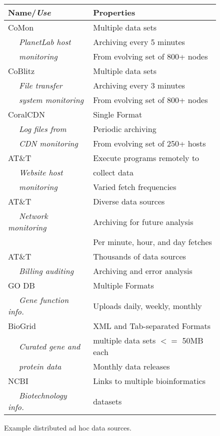 \begin{figure}
\begin{center}
\begin{tabular}{|l|l|}
\hline
{\bf Name/{\em Use}} & {\bf Properties} 
\\\hline\hline
CoMon~\cite{comon} & Multiple data sets \\
{\em ~~ PlanetLab host}              & Archiving every 5 minutes \\
{\em ~~ monitoring}                              & From evolving set of 800+ nodes \\\hline
CoBlitz~\cite{coblitz}   & Multiple data sets \\
{\em ~~ File transfer}        & Archiving every 3 minutes \\
{\em ~~ system monitoring}                                      & From evolving set of 800+ nodes \\\hline
CoralCDN~\cite{coral}         & Single Format \\
{\em ~~ Log files from}  & Periodic archiving \\
{\em ~~ CDN monitoring}                  & From evolving set of 250+ hosts \\\hline
AT\&T \vizGems{}                    & Execute programs remotely to \\
{\em ~~ Website host}                 & collect data \\
{\em ~~  monitoring}                   & Varied fetch frequencies \\\hline
AT\&T \darkstar{}                   & Diverse data sources\\
{\em ~~ Network monitoring}       & Archiving for future analysis \\
				& Per minute, hour, and day fetches\\\hline
AT\&T \ningaui{}                    & Thousands of data sources\\
{\em ~~ Billing auditing}        & Archiving and error analysis\\\hline
GO DB~\cite{geneontology} & Multiple Formats \\
{\em ~~ Gene function info.}     & Uploads daily, weekly, monthly \\\hline
BioGrid~\cite{biogrid}        & XML and Tab-separated Formats \\
{\em ~~ Curated gene and}  & multiple data sets $<=$ 50MB each \\
{\em ~~ protein data}                              & Monthly data releases \\\hline
NCBI~\cite{ncbi} & Links to multiple bioinformatics  \\
{\em ~~ Biotechnology info.} & datasets\\
\hline
\end{tabular}
\end{center}
\caption{Example distributed ad hoc data sources.}
\label{fig:exampledata}
\end{figure}

